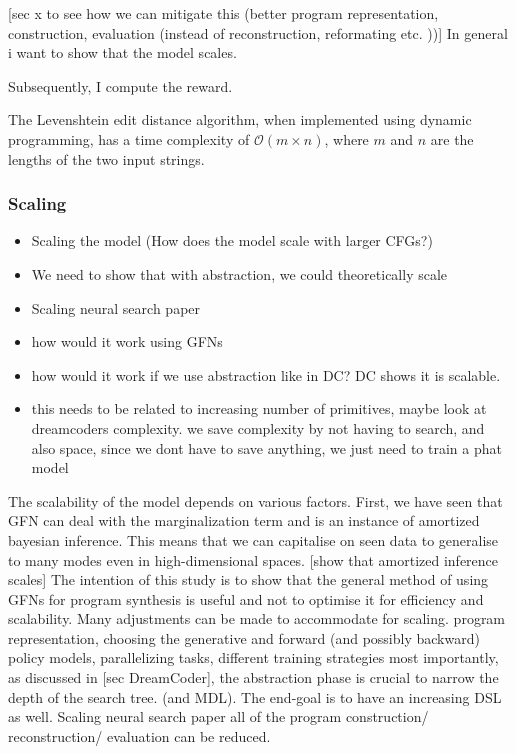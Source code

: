 [sec x to see how we can mitigate this (better program representation, construction, evaluation (instead of reconstruction, reformating etc. ))]
In general i want to show that the model scales. 

Subsequently, I compute the reward.

The Levenshtein edit distance algorithm, when implemented using dynamic programming, has a time complexity of 
$\mathcal{O}(m \times n)$, where $m$ and  $n$ are the lengths of the two input strings.
\subsubsection{Scaling}
\begin{itemize}
    \item Scaling the model (How does the model scale with larger CFGs?)
    \item We need to show that with abstraction, we could theoretically scale
    \item Scaling neural search paper
    \item how would it work using GFNs
    \item how would it work if we use abstraction like in DC? DC shows it is scalable.
    \item this needs to be related to increasing number of primitives, maybe look at dreamcoders complexity. we save complexity by not having to search, and also space, since we dont have to save anything, we just need to train a phat model
\end{itemize}
    


The scalability of the model depends on various factors. First, we have seen that GFN can deal with the marginalization term and is an instance of amortized bayesian inference. This means that we can capitalise on seen data to generalise to many modes even in high-dimensional spaces. [show that amortized inference scales]
The intention of this study is to show that the general method of using GFNs for program synthesis is useful and not to optimise it for efficiency and scalability. Many adjustments can be made to accommodate for scaling. 
program representation, 
choosing the generative and forward (and possibly backward) policy models, 
parallelizing tasks,
different training strategies
most importantly, as discussed in [sec DreamCoder], the abstraction phase is crucial to narrow the depth of the search tree. (and MDL). 
The end-goal is to have an increasing DSL as well. 
Scaling neural search paper
all of the program construction/ reconstruction/ evaluation can be reduced. 


